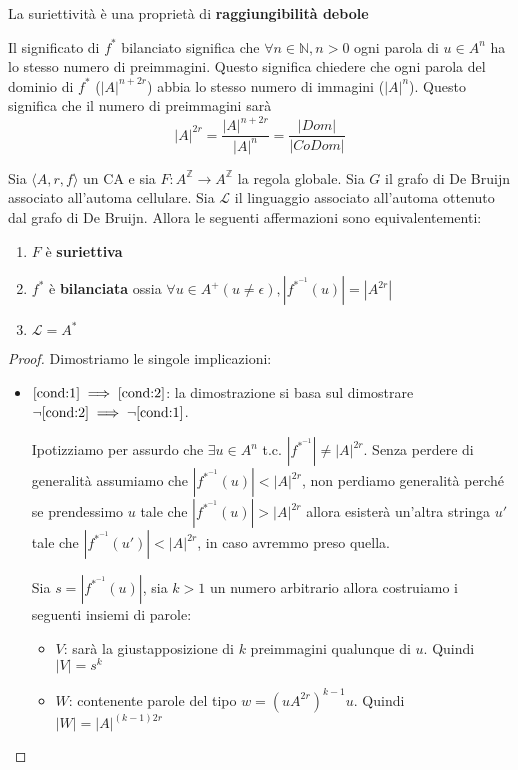La suriettività è una proprietà di \textbf{raggiungibilità debole}

\begin{nota}
    Il significato di $f^{\ast}$ bilanciato significa che $\forall n\in \mathbb{N}, n>0$
    ogni parola di $u\in A^n$ ha lo stesso numero di preimmagini. Questo significa
    chiedere che ogni parola del dominio di $f^{\ast}$ ($|A|^{n+2r}$) abbia lo stesso 
    numero di immagini ($|A|^n$). Questo significa che il numero di preimmagini
    sarà
    \begin{equation*}
        |A|^{2r} = \frac{|A|^{n+2r}}{|A|^n} = \frac{|Dom|}{|CoDom|}
    \end{equation*}
\end{nota}

\begin{teorema}
    Sia $\langle A,r,f\rangle$ un CA e sia $F: A^\mathbb{Z}\rightarrow A^\mathbb{Z}$
    la regola globale. Sia $G$ il grafo di De Bruijn associato all'automa cellulare.
    Sia $\mathcal{L}$ il linguaggio associato all'automa ottenuto dal grafo di De Bruijn.
    Allora le seguenti affermazioni sono equivalentementi:
    \begin{enumerate}
        \item \label{cond:1}$F$ è \textbf{suriettiva}
        \item \label{cond:2}$f^\ast$ è \textbf{bilanciata} ossia $\forall u \in A^+ (u\ne \epsilon), |f^{\ast^{-1}}(u)|= |A^{2r}|$
        \item \label{cond:3}$\mathcal{L} = A^\ast$
    \end{enumerate}
    \begin{proof}
        Dimostriamo le singole implicazioni:
        \begin{itemize}
            \item $\ref{cond:1}\implies \ref{cond:2}$: la dimostrazione si basa 
            sul dimostrare $\lnot \ref{cond:2}\implies \lnot \ref{cond:1}$.

            Ipotizziamo per assurdo che $\exists u\in A^n$ t.c. $|f^{\ast^{-1}}|\ne |A|^{2r}$.
            Senza perdere di generalità assumiamo che $|f^{\ast^{-1}}(u)|< |A|^{2r}$,
            non perdiamo generalità perché se prendessimo $u$ tale che $|f^{\ast^{-1}}(u)|> |A|^{2r}$
            allora esisterà un'altra stringa $u'$ tale che $|f^{\ast^{-1}}(u')|< |A|^{2r}$,
            in caso avremmo preso quella.

            Sia $s = |f^{\ast^{-1}}(u)|$, sia $k>1$ un numero arbitrario allora costruiamo
            i seguenti insiemi di parole:
            \begin{itemize}
                \item $V$: sarà la giustapposizione di $k$ preimmagini qualunque 
                di $u$. Quindi $|V| = s^k$
                \item $W$: contenente parole del tipo $w=(uA^{2r})^{k-1}u$. Quindi $|W| = |A|^{(k-1)2r}$
            \end{itemize}


\end{itemize}
\end{proof}
\end{teorema}
